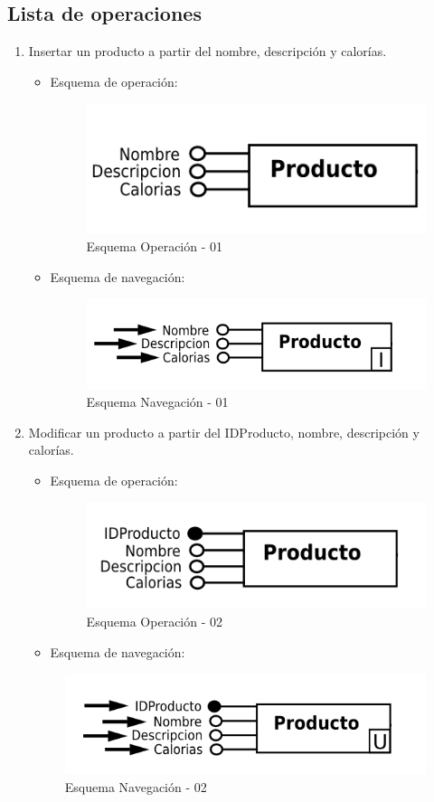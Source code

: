 \documentclass[a4paper,12pt]{report}
\begin{document}
\subsection{Lista de operaciones}
\label{sec-7-2-1}
\begin{enumerate}
\item Insertar un producto a partir del nombre, descripción y
calorías.
\begin{itemize}
\item Esquema de operación:
\begin{figure}[!htp]
\centering
\includegraphics[width=0.6\linewidth]{./operaciones/img/Productos/01_ope.png}
\caption{Esquema Operación - 01}
\label{fig:ope01}
\medskip
\footnotesize
{}
\end{figure}
\item Esquema de navegación:
\begin{figure}[!htp]
\centering
\includegraphics[width=0.6\linewidth]{./operaciones/img/Productos/01_nav.png}
\caption{Esquema Navegación - 01}
\label{fig:nave01}
\medskip
\footnotesize
{}
\end{figure}
\end{itemize}

\item Modificar un producto a partir del IDProducto, nombre,
descripción y calorías.
\begin{itemize}
\item Esquema de operación:
\begin{figure}[!htp]
\centering
\includegraphics[width=0.6\linewidth]{./operaciones/img/Productos/02_ope.png}
\caption{Esquema Operación - 02}
\label{fig:ope02}
\medskip
\footnotesize
{}
\end{figure}
\item Esquema de navegación:
\end{itemize}
\begin{figure}[!htp]
\centering
\includegraphics[width=0.6\linewidth]{./operaciones/img/Productos/02_nav.png}
\caption{Esquema Navegación - 02}
\label{fig:nave02}
\medskip
\footnotesize
{}
\end{figure}


\end{enumerate}
\end{document}
